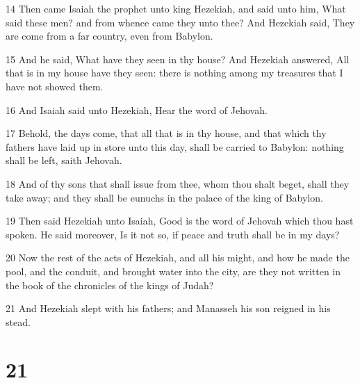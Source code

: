 \par 14 Then came Isaiah the prophet unto king Hezekiah, and said unto him, What said these men? and from whence came they unto thee? And Hezekiah said, They are come from a far country, even from Babylon.
\par 15 And he said, What have they seen in thy house? And Hezekiah answered, All that is in my house have they seen: there is nothing among my treasures that I have not showed them.
\par 16 And Isaiah said unto Hezekiah, Hear the word of Jehovah.
\par 17 Behold, the days come, that all that is in thy house, and that which thy fathers have laid up in store unto this day, shall be carried to Babylon: nothing shall be left, saith Jehovah.
\par 18 And of thy sons that shall issue from thee, whom thou shalt beget, shall they take away; and they shall be eunuchs in the palace of the king of Babylon.
\par 19 Then said Hezekiah unto Isaiah, Good is the word of Jehovah which thou hast spoken. He said moreover, Is it not so, if peace and truth shall be in my days?
\par 20 Now the rest of the acts of Hezekiah, and all his might, and how he made the pool, and the conduit, and brought water into the city, are they not written in the book of the chronicles of the kings of Judah?
\par 21 And Hezekiah slept with his fathers; and Manasseh his son reigned in his stead.

\chapter{21}

